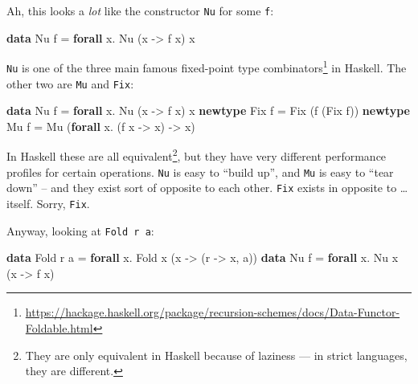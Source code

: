 \documentclass[]{article}
\newenvironment{Shaded}{}{}
\newcommand{\DataTypeTok}[1]{\textcolor[rgb]{0.56,0.13,0.00}{#1}}
\newcommand{\KeywordTok}[1]{\textcolor[rgb]{0.00,0.44,0.13}{\textbf{#1}}}
\newcommand{\NormalTok}[1]{#1}
\newcommand{\OperatorTok}[1]{\textcolor[rgb]{0.40,0.40,0.40}{#1}}
\newcommand{\OtherTok}[1]{\textcolor[rgb]{0.00,0.44,0.13}{#1}}
\renewcommand{\href}[2]{#2\footnote{\url{#1}}}
\begin{document}
Ah, this looks a \emph{lot} like the constructor \texttt{Nu} for some
\texttt{f}:

\begin{Shaded}
\begin{Highlighting}[]
\KeywordTok{data} \DataTypeTok{Nu}\NormalTok{ f }\OtherTok{=} \KeywordTok{forall}\NormalTok{ x}\OperatorTok{.} \DataTypeTok{Nu}\NormalTok{ (x }\OtherTok{{-}>}\NormalTok{ f x) x}
\end{Highlighting}
\end{Shaded}

\texttt{Nu} is one of the three main famous
\href{https://hackage.haskell.org/package/recursion-schemes/docs/Data-Functor-Foldable.html}{fixed-point
type combinators} in Haskell. The other two are \texttt{Mu} and \texttt{Fix}:

\begin{Shaded}
\begin{Highlighting}[]
\KeywordTok{data}    \DataTypeTok{Nu}\NormalTok{  f }\OtherTok{=} \KeywordTok{forall}\NormalTok{ x}\OperatorTok{.} \DataTypeTok{Nu}\NormalTok{ (x }\OtherTok{{-}>}\NormalTok{ f x) x}
\KeywordTok{newtype} \DataTypeTok{Fix}\NormalTok{ f }\OtherTok{=} \DataTypeTok{Fix}\NormalTok{ (f (}\DataTypeTok{Fix}\NormalTok{ f))}
\KeywordTok{newtype} \DataTypeTok{Mu}\NormalTok{  f }\OtherTok{=} \DataTypeTok{Mu}\NormalTok{ (}\KeywordTok{forall}\NormalTok{ x}\OperatorTok{.}\NormalTok{ (f x }\OtherTok{{-}>}\NormalTok{ x) }\OtherTok{{-}>}\NormalTok{ x)}
\end{Highlighting}
\end{Shaded}

In Haskell these are all equivalent\footnote{They are only equivalent in Haskell
  because of laziness --- in strict languages, they are different.}, but they
have very different performance profiles for certain operations. \texttt{Nu} is
easy to ``build up'', and \texttt{Mu} is easy to ``tear down'' -- and they exist
sort of opposite to each other. \texttt{Fix} exists in opposite to \ldots{}
itself. Sorry, \texttt{Fix}.

Anyway, looking at \texttt{Fold\ r\ a}:

\begin{Shaded}
\begin{Highlighting}[]
\KeywordTok{data} \DataTypeTok{Fold}\NormalTok{ r a }\OtherTok{=} \KeywordTok{forall}\NormalTok{ x}\OperatorTok{.} \DataTypeTok{Fold}\NormalTok{ x (x }\OtherTok{{-}>}\NormalTok{ (r }\OtherTok{{-}>}\NormalTok{ x, a))}
\KeywordTok{data} \DataTypeTok{Nu}\NormalTok{   f   }\OtherTok{=} \KeywordTok{forall}\NormalTok{ x}\OperatorTok{.} \DataTypeTok{Nu}\NormalTok{   x (x }\OtherTok{{-}>}\NormalTok{ f x)}
\end{Highlighting}
\end{Shaded}
\end{document}
